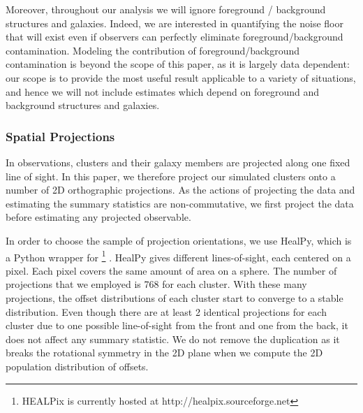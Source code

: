 \documentclass[usenatbib]{mn2e}
\newcommand{\ap}[1]{\textcolor{cyan}{#1}}
\begin{document}
{Moreover, throughout our analysis we will ignore foreground / background structures and galaxies. Indeed, we are interested in quantifying the noise floor that will exist even if observers can perfectly eliminate foreground/background contamination. Modeling the contribution of foreground/background contamination is beyond the scope of this paper, as it is largely data dependent: our scope is to provide the most useful result applicable to a variety of situations, and hence we will not include estimates which depend on foreground and background structures and galaxies.


\subsubsection{Spatial Projections}
\label{subsubsec:projections}
In observations, clusters and their galaxy members are projected along one fixed line of sight. %
In this paper, we therefore project our simulated clusters onto a number of 2D orthographic projections.
As the actions of projecting the data and estimating the summary statistics are
non-commutative, we first project the data before estimating any projected 
observable. 

In order to choose the sample of projection orientations, we use {\sc HealPy},
which is a {\sc Python} wrapper for
{}\footnote{HEALPix is
currently hosted at http://healpix.sourceforge.net}
\citep{Gorski2005}. {\sc HealPy} gives different
lines-of-sight, each centered on a {}
pixel. Each pixel covers the same amount of area on a sphere. 
The number of projections that we employed is 768 for each cluster. With these
many projections, the offset distributions of each cluster start to converge to a
stable distribution. 
Even though there are at least 2 identical projections for each cluster due to
one possible line-of-sight from the front and one from the back, it does not
affect any summary statistic. We do not remove the duplication as it breaks
the rotational symmetry in the 2D plane when we compute the 2D population
distribution of offsets.  

}
\end{document}
